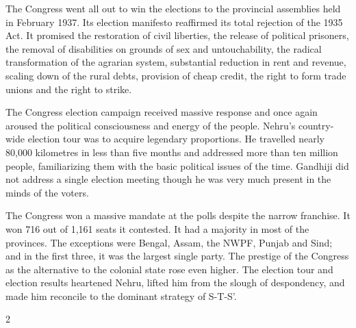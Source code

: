 \begin{multicols}{2}
The Congress went all out to win the elections to the provincial assemblies held in February 1937. Its election manifesto reaffirmed its total rejection of the 1935 Act. It promised the restoration of civil liberties, the release of political prisoners, the removal of disabilities on grounds of sex and untouchability, the radical transformation of the agrarian system, substantial reduction in rent and revenue, scaling down of the rural debts, provision of cheap credit, the right to form trade unions and the right to strike. 

The Congress election campaign received massive response and once again aroused the political consciousness and energy of the people. Nehru's country-wide election tour was to acquire legendary proportions. He travelled nearly 80,000 kilometres in less than five months and addressed more than ten million people, familiarizing them with the basic political issues of the time. Gandhiji did not address a single election meeting though he was very much present in the minds of the voters. 

The Congress won a massive mandate at the polls despite the narrow franchise. It won 716 out of 1,161 seats it contested. It had a majority in most of the provinces. The exceptions were Bengal, Assam, the NWPF, Punjab and Sind; and in the first three, it was the largest single party. The prestige of the Congress as the alternative to the colonial state rose even higher. The election tour and election results heartened Nehru, lifted him from the slough of despondency, and made him reconcile to the dominant strategy of S-T-S'.
\end{multicols}{2}
